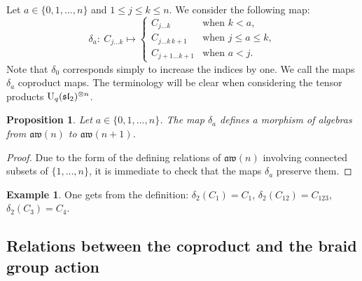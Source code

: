 \documentclass[pdftex]{sigma}
\numberwithin{equation}{section}
\newtheorem{prop}[theo]{Proposition}
\theoremstyle{definition}
\newtheorem{exam}[theo]{Example}
\newcommand{\aw}{\mathfrak{aw}(n)}
\begin{document}
Let $a\in\{0,1,\dots,n\}$ and $1\leq j\leq k\leq n$. We consider the following map:
\begin{equation}\label{eq:delta}
\delta_a\colon \
C_{j\dots k} \mapsto
\begin{cases}
C_{j\dots k}&\mbox{when } k<a ,\\
 C_{j\dots k\,k+1}&\mbox{when } j\leq a\leq k ,\\
 C_{j+1\dots k+1}&\mbox{when } a<j .
 \end{cases}
\end{equation}
Note that $\delta_0$ corresponds simply to increase the indices by one. We call the maps $\delta_a$ coproduct maps. The terminology will be clear when considering the tensor products ${\rm U}_q(\mathfrak{sl}_2)^{\otimes n}$.
\begin{prop}
 Let $a\in\{0,1,\dots,n\}$. The map $\delta_a$ defines a morphism of algebras from $\aw$ to $\mathfrak{aw}(n+1)$.
\end{prop}
\begin{proof}
Due to the form of the defining relations of $\aw$ involving connected subsets of $\{1,\dots,n\}$, it is immediate to check that the maps $\delta_a$ preserve them.
\end{proof}

\begin{exam}
One gets from the definition: $\delta_2(C_1)=C_1$, $\delta_2(C_{12})=C_{123}$, $\delta_2(C_{3})=C_{4}$.
\end{exam}

\subsection{Relations between the coproduct and the braid group action}
\end{document}
